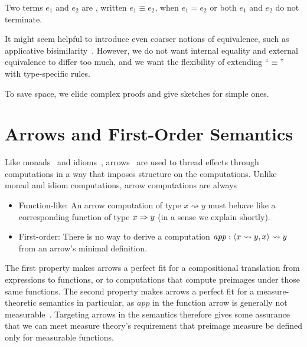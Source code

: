 \documentclass{llncs}
\newcommand{\arrow}{\rightsquigarrow}
\begin{document}
\begin{definition}
Two \lzfclang terms $\mathit{e_1}$ and $\mathit{e_2}$ are , written $\mathit{e_1} \equiv \mathit{e_2}$, when $\mathit{e_1} = \mathit{e_2}$ or both $\mathit{e_1}$ and $\mathit{e_2}$ do not terminate.
\end{definition}

It might seem helpful to introduce even coarser notions of equivalence, such as applicative bisimilarity~\cite{cit:abramsky-1990rtfp-bisimilarity}.
However, we do not want internal equality and external equivalence to differ too much, and we want the flexibility of extending ``$\equiv$'' with type-specific rules.

To save space, we elide complex proofs and give sketches for simple ones.



\section{Arrows and First-Order Semantics}

Like monads~\cite{cit:wadler-2001-monads} and idioms~\cite{cit:mcbride-2008jfp-idiom}, arrows~\cite{cit:hughes-2000scp-arrows} are used to thread effects through computations in a way that imposes structure on the computations.
Unlike monad and idiom computations, arrow computations are always
\begin{itemize}
	\item Function-like: An arrow computation of type $x \arrow y$ must behave like a corresponding function of type $x \Rightarrow y$ (in a sense we explain shortly).
	\item First-order: There is no way to derive a computation $app : \pair{x \arrow y, x} \arrow y$ from an arrow's minimal definition.
\end{itemize}
The first property makes arrows a perfect fit for a compositional translation from expressions to functions, or to computations that compute preimages under those same functions.
The second property makes arrows a perfect fit for a measure-theoretic semantics in particular, as $app$ in the function arrow is generally not measurable~\cite{cit:aumann-1961ijm-borel}.
Targeting arrows in the semantics therefore gives some assurance that we can meet measure theory's requirement that preimage measure be defined only for measurable functions.
\end{document}
